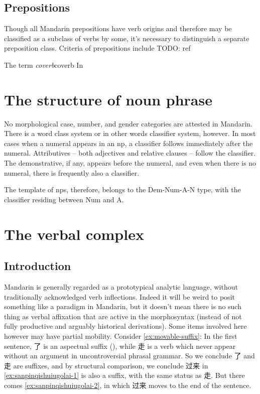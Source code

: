 \documentclass[UTF8, a4paper, oneside, scheme=plain]{ctexrep}
\newcommand*{\term}[1]{\emph{#1}}
\begin{document}
\section{Prepositions}\label{sec:preposition-pos}

Though all Mandarin prepositions have verb origins 
and therefore may be classified as a subclass of verbs by some,
it's necessary to distinguish a separate preposition class.
Criteria of prepositions include TODO: ref

\begin{infobox}{The term \term{coverb}}{coverb}
    In 
\end{infobox}


\chapter{The structure of noun phrase}

No morphological case, number, and gender categories are attested in Mandarin.
There is a word class system or in other words classifier system, however.
In most cases when a numeral appears in an \ac{np},
a classifier follows immediately after the numeral.
Attributives -- both adjectives and relative clauses -- 
follow the classifier. %
The demonstrative, if any, appears before the numeral,
and even when there is no numeral,
there is frequently also a classifier.

The template of \ac{np}s, therefore, belongs to the 
Dem-Num-A-N type,
with the classifier residing between Num and A. 


\chapter{The verbal complex}\label{chap:verbal-complex}

\section{Introduction}

Mandarin is generally regarded as a prototypical analytic language,
without traditionally acknowledged verb inflections.
Indeed it will be weird to posit something like a paradigm in Mandarin,
but it doesn't mean there is no such thing as verbal affixation that are active
in the morphosyntax 
(instead of not fully productive and arguably historical derivations).
Some items involved here however may have partial mobility.
Consider \eqref{ex:movable-suffix}:
In the first sentence, 
了 is an aspectual suffix (),
while 走 is a verb which never appear without an argument in uncontroversial phrasal grammar.
So we conclude 了 and 走 are suffixes,
and by structural comparison, 
we conclude 过来 in \eqref{ex:sanpinqishuiugolai-1} 
is also a suffix, with the same status as 走.
But there comes \eqref{ex:sanpinqishuiugolai-2},
in which 过来 moves to the end of the sentence.
\end{document}
